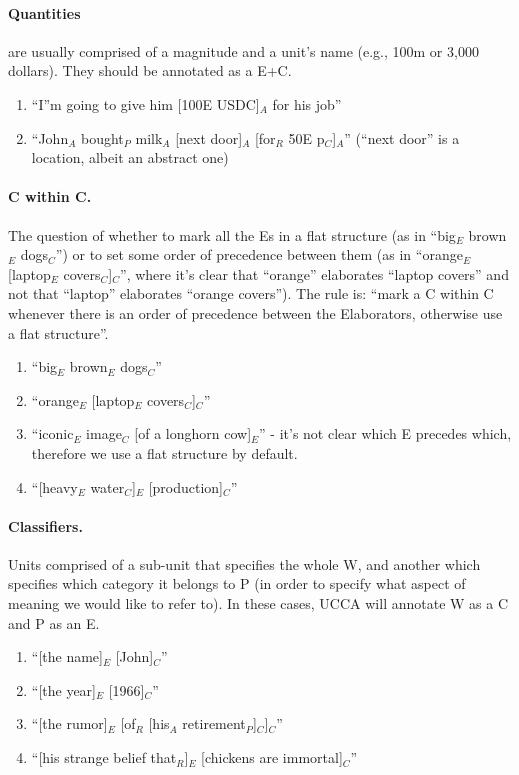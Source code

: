 \documentclass[11pt]{article}
\newcommand{\be}{\begin{enumerate}}
\newcommand{\ee}{\end{enumerate}}
\begin{document}
\paragraph{Quantities} are usually comprised of a magnitude and a unit's name (e.g., 100m or 3,000 dollars). They should be annotated as a E+C.
\be \item
``I''m going to give him [100E USDC]$_A$ for his job''
\item
``John$_A$ bought$_P$ milk$_A$ [next door]$_A$ [for$_R$ 50E p$_C$]$_A$'' (``next door'' is a location, albeit an abstract one)
\ee

\paragraph{
C within C.} The question of whether to mark all the Es in a flat structure (as in ``big$_E$ brown$_E$ dogs$_C$'') or to set some order of precedence between them (as in ``orange$_E$ [laptop$_E$ covers$_C$]$_C$'', where it's clear that ``orange'' elaborates ``laptop covers'' and not that ``laptop'' elaborates ``orange covers''). The rule is: ``mark a C within C whenever there is an order of precedence between the Elaborators, otherwise use a flat structure''.
\be \item
``big$_E$ brown$_E$ dogs$_C$''
\item
``orange$_E$ [laptop$_E$ covers$_C$]$_C$''
\item
``iconic$_E$ image$_C$ [of a longhorn cow]$_E$'' - it's not clear which E precedes which, therefore we use a flat structure by default.
\item
``[heavy$_E$ water$_C$]$_E$ [production]$_C$''
\ee

\paragraph{
Classifiers.} Units comprised of a sub-unit that specifies the whole W, and another which specifies which category it belongs to P (in order to specify what aspect of meaning we would like to refer to). In these cases, UCCA will annotate W as a C and P as an E.
\be \item
``[the name]$_E$ [John]$_C$''
\item
``[the year]$_E$ [1966]$_C$''
\item
``[the rumor]$_E$ [of$_R$ [his$_A$ retirement$_P$]$_C$]$_C$''
\item
``[his strange belief that$_R$]$_E$ [chickens are immortal]$_C$''
\ee
\end{document}
